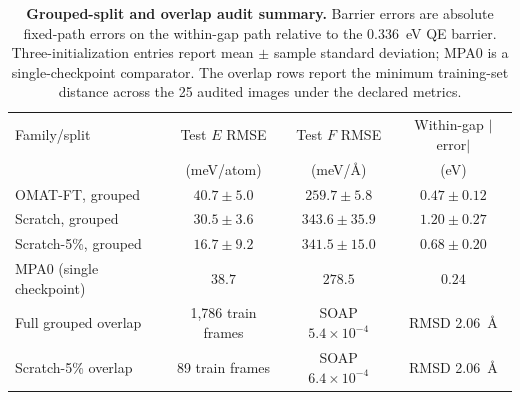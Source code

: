 \begin{table}[htbp]
\centering
\caption{\textbf{Grouped-split and overlap audit summary.} Barrier errors are absolute fixed-path errors on the within-gap path relative to the 0.336~eV QE barrier. Three-initialization entries report mean $\pm$ sample standard deviation; MPA0 is a single-checkpoint comparator. The overlap rows report the minimum training-set distance across the 25 audited images under the declared metrics.}
\label{tab:a2_grouped_audit_summary}
\begin{tabular}{lccc}
\toprule
Family/split & Test $E$ RMSE & Test $F$ RMSE & Within-gap $|$error$|$ \\
 & (meV/atom) & (meV/\AA) & (eV) \\
\midrule
OMAT-FT, grouped & $40.7 \pm 5.0$ & $259.7 \pm 5.8$ & $0.47 \pm 0.12$ \\
Scratch, grouped & $30.5 \pm 3.6$ & $343.6 \pm 35.9$ & $1.20 \pm 0.27$ \\
Scratch-5\%, grouped & $16.7 \pm 9.2$ & $341.5 \pm 15.0$ & $0.68 \pm 0.20$ \\
MPA0 (single checkpoint) & $38.7$ & $278.5$ & $0.24$ \\
\midrule
Full grouped overlap & 1,786 train frames & SOAP $5.4\times10^{-4}$ & RMSD 2.06~\AA{} \\
Scratch-5\% overlap & 89 train frames & SOAP $6.4\times10^{-4}$ & RMSD 2.06~\AA{} \\
\bottomrule
\end{tabular}
\end{table}
